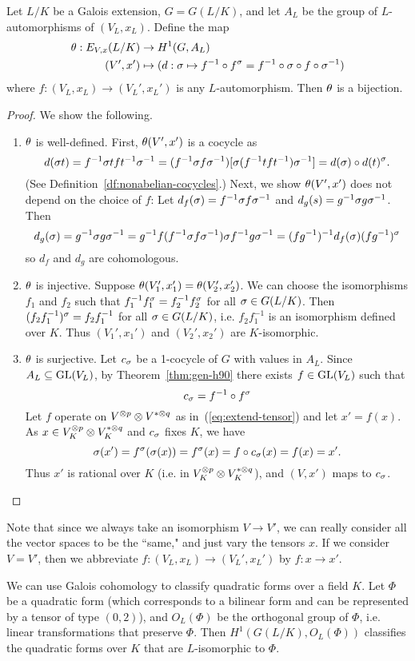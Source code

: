 \begin{thm}
Let $L/K$ be a Galois extension, $G=G(L/K)$, and let $A_L$ be the group of $L$-automorphisms of $(V_L,x_L)$.
Define the map
\begin{align*}
\theta:E_{V,x}(L/K)&\to H^1(G,A_L)\\
(V',x')&\mapsto (d:\sigma \mapsto f^{-1}\circ f^{\sigma }=f^{-1}\circ \sigma  \circ f \circ \sigma ^{-1})
\end{align*}
where $f:(V_L,x_L)\to (V_L',x_L')$ is any $L$-automorphism. 
Then $\theta$ is a bijection.
\end{thm}
\begin{proof}
We show the following.
\begin{enumerate}
\item $\theta$ is well-defined. First, $\theta(V',x')$ is a cocycle as
\[
d(\sigma t)=f^{-1}\sigma tft^{-1}\sigma^{-1}=(f^{-1}\sigma f\sigma^{-1})[\sigma (f^{-1}tft^{-1})\sigma^{-1}]=d(\sigma )\circ d(t)^{\sigma }.
\]
(See Definition~\ref{df:nonabelian-cocycles}.) 
Next, we show $\theta(V',x')$ does not depend on the choice of $f$: Let $d_f(\sigma )=f^{-1}\sigma f\sigma^{-1}$ and $d_g(s)=g^{-1}\sigma g\sigma^{-1}$. Then
\[
d_g(\sigma )=g^{-1}\sigma g\sigma^{-1}= g^{-1}f(f^{-1}\sigma f\sigma^{-1})\sigma f^{-1}g\sigma^{-1}
=(fg^{-1})^{-1}d_f(\sigma ) (fg^{-1})^{\sigma }
\]
so $d_f$ and $d_g$ are cohomologous.
\item $\theta$ is injective. Suppose $\theta(V_1',x_1')=\theta(V_2',x_2')$. We can choose the isomorphisms $f_1$ and $f_2$ such that $f_1^{-1}f_1^{\sigma }=f_2^{-1}f_2^{\sigma}$ for all $\sigma \in G(L/K)$. Then $(f_2f_1^{-1})^{\sigma }=f_2f_1^{-1}$ for all $\sigma \in G(L/K)$, i.e. $f_2f_1^{-1}$ is an isomorphism defined over $K$. %
Thus $(V_1',x_1')$ and $(V_2',x_2')$ are $K$-isomorphic.
\item $\theta$ is surjective. Let $c_{\sigma}$ be a 1-cocycle of $G$ with values in $A_L$. Since $A_L\subseteq \operatorname{GL}(V_L)$, by Theorem~\ref{thm:gen-h90} there exists $f\in \operatorname{GL}(V_L)$ such that
\[
c_{\sigma}=f^{-1}\circ f^{\sigma}
\]
Let $f$ operate on $V^{\otimes p}\otimes V^{*\otimes q}$ as in~(\ref{eq:extend-tensor}) and let $x'=f(x)$. As $x\in V_K^{\otimes p}\otimes V_K^{*\otimes q}$ and $c_{\sigma}$ fixes $K$, we have 
\[
\sigma(x')=f^{\sigma}(\sigma(x))=f^{\sigma}(x)=f\circ c_{\sigma}(x)=f(x)=x'.
\]
Thus $x'$ is rational over $K$ (i.e. in $V_K^{\otimes p}\otimes V_K^{*\otimes q}$), and $(V,x')$ maps to $c_{\sigma}$.
\end{enumerate}
\end{proof}
Note that since we always take an isomorphism $V\to V'$, we can really consider all the vector spaces to be the ``same," and just vary the tensors $x$. If we consider $V=V'$, then we abbreviate $f:(V_L,x_L)\to (V_L',x_L')$ by $f:x\to x'$.
\begin{ex}
We can use Galois cohomology to classify quadratic forms over a field $K$. Let $\Phi$ be a quadratic form (which corresponds to a bilinear form and can be represented by a tensor of type $(0,2)$), and $O_L(\Phi)$ be the orthogonal group of $\Phi$, i.e. linear transformations that preserve $\Phi$. Then $H^1(G(L/K),O_L(\Phi))$ classifies the quadratic forms over $K$ that are $L$-isomorphic to $\Phi$.
\end{ex}

